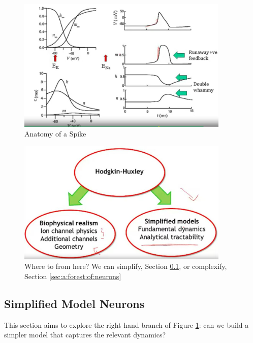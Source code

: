 \documentclass[]{article}
\begin{document}
\begin{figure}[H]
	\caption[Anatomy of a Spike]{Anatomy of a Spike}
	\includegraphics[width=0.9\textwidth]{anatomy-of-a-spike}
\end{figure}

\begin{figure}[H]
	\caption[Where to from here? Simplification or Realism?]{Where to from here? We can simplify, Section \ref{sec:simplified:model_neurons}, or complexify, Section \ref{sec:a:forest:of:neurons}}\label{fig:where:to_from:here}
	\includegraphics[width=0.9\textwidth]{where-to-from-here}
\end{figure}

\subsection{Simplified Model Neurons}\label{sec:simplified:model_neurons}
This section aims to explore the right hand branch of Figure \ref{fig:where:to_from:here}: can we build a simpler model that captures the relevant dynamics?
\end{document}
